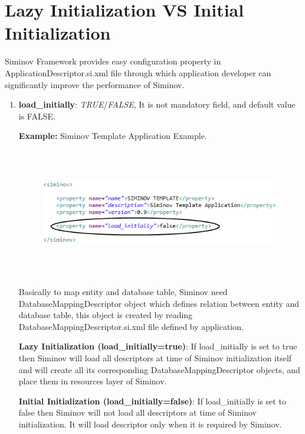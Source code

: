 \section{Lazy Initialization VS Initial Initialization}

Siminov Framework provides easy configuration property in ApplicationDescriptor.si.xml file through which application developer can significantly improve the performance of Siminov. 


\begin{enumerate}

	\item \small \textbf{load\_initially}: \textit{TRUE}/\textit{FALSE}, It is not mandatory field, and default value is FALSE.

		\par
		\textbf{Example:} Siminov Template Application Example.
		\begin{figure}[htbp]
			\centering
				\includegraphics[height=5.6cm]{Resources/siminov_application_template_application_descriptor_load_example.png}
		\end{figure}

		\par
			Basically to map entity and database table, Siminov need DatabaseMappingDescriptor object which defines relation between entity and database table, this object is created by reading DatabaseMappingDescriptor.si.xml file defined by application.

		\par
			\textbf{Lazy Initialization (load\_initially=true)}: If load\_initially is set to true then Siminov will load all descriptors at time of Siminov initialization itself and will create all its corresponding DatabaseMappingDescriptor objects, and place them in resources layer of Siminov.

		\par
			\textbf{Initial Initialization (load\_initially=false)}: If load\_initially is set to false then Siminov will not load all descriptors at time of Siminov initialization. It will load descriptor only when it is required by Siminov.

\end{enumerate}



